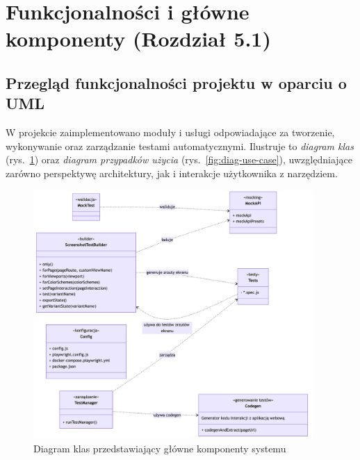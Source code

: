 \documentclass[12pt]{report}
\begin{document}
\section{Funkcjonalności i główne komponenty (Rozdział 5.1)}

\subsection{Przegląd funkcjonalności projektu w oparciu o UML}
\label{sec:przeglad-funkcjonalnosci}
W projekcie zaimplementowano moduły i usługi odpowiadające za tworzenie, wykonywanie oraz zarządzanie testami automatycznymi. Ilustruje to \emph{diagram klas} (rys.~\ref{fig:diag-klas}) oraz \emph{diagram przypadków użycia} (rys.~\ref{fig:diag-use-case}), uwzględniające zarówno perspektywę architektury, jak i interakcje użytkownika z narzędziem.

\begin{figure}[H]
\centering
\includegraphics[width=0.95\textwidth]{diagram-projekt.png}
\caption{Diagram klas przedstawiający główne komponenty systemu}
\label{fig:diag-klas}
\end{figure}
\end{document}
